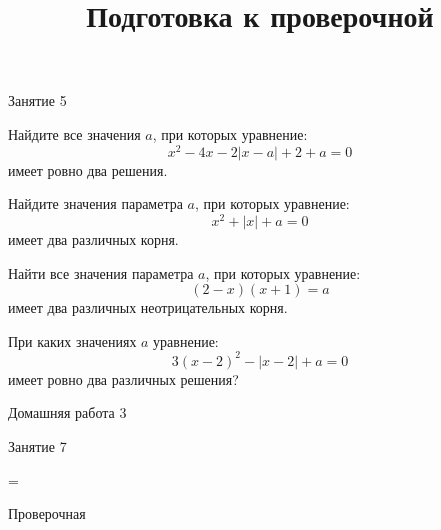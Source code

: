 \begin{class}[number=5]
	\begin{listofex}
		\item Занятие 5
	\end{listofex}
\end{class}

\begin{class}[number=6]
	\begin{listofex}
		\item Найдите все значения \(a\), при которых уравнение: \[ x^2-4x-2|x-a|+2+a=0 \] имеет ровно два решения.
		\item Найдите значения параметра \(a\), при которых уравнение: \[ x^2+|x|+a=0 \] имеет два различных корня.
		\item Найти все значения параметра \(a\), при которых уравнение: \[(2-x)(x+1)=a\] имеет два различных неотрицательных корня.
		\item При каких значениях \(a\) уравнение: \[ 3(x-2)^2 - |x-2|+a=0 \] имеет ровно два различных решения?
	\end{listofex}
\end{class}

\begin{homework}[number=3]
	\begin{listofex}
		\item Домашняя работа 3
	\end{listofex}
\end{homework}

\begin{class}[number=7]
	\title{Подготовка к проверочной}
	\begin{listofex}
		\item Занятие 7
	\end{listofex}
\end{class}

=%
\begin{exam}
	\begin{listofex}
		\item Проверочная
	\end{listofex}
\end{exam}

